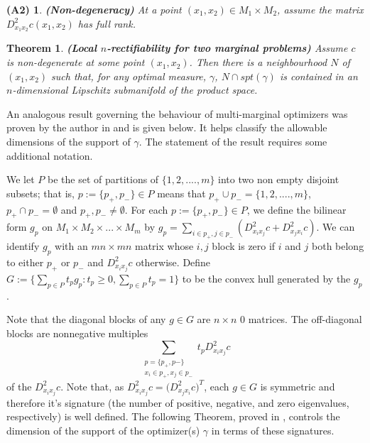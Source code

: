 \documentclass[letter,10pt]{article}
\theoremstyle{dotless}
\begin{document}
\newtheorem*{nondeg}{(A2)}
\begin{nondeg}
\textbf{(Non-degeneracy)} At a point $(x_1,x_2) \in M_1 \times M_2$, assume  the matrix $D_{x_1x_2}^2c(x_1,x_2)$ has full rank.  
\end{nondeg}

\newtheorem{rectifiability}{Theorem}[subsection]
\begin{rectifiability}\label{rectifiability}\textbf{(Local $n$-rectifiability for two marginal problems)}
Assume $c$ is non-degenerate at some point $(x_1,x_2)$.  Then there is a neighbourhood $N$ of $(x_1,x_2)$ such that, for any optimal measure, $\gamma$, $N \cap spt(\gamma)$ is contained in an $n$-dimensional Lipschitz submanifold of the product space.
\end{rectifiability}

An analogous result governing the behaviour of multi-marginal optimizers was proven by the author in \cite{P} and is given below.  It helps classify the allowable dimensions of the support of $\gamma$.  The statement of the result requires some additional notation.

We let $P$ be the set of partitions of $\{1,2,....,m\}$ into two non empty  disjoint subsets; that is, $p:=\{p_+,p_-\} \in P$ means that $p_+ \cup p_- = \{1,2,....,m\}$, $p_+ \cap p_- =\emptyset$ and $p_+,p_- \neq \emptyset$.  For each $p:=\{p_+,p_-\} \in P$, we define the bilinear form $g_p$ on $M_1 \times M_2 \times...\times M_m$ by $g_p = \sum_{i\in p_+,j\in p_-}(D^2_{x_ix_j}c +D^2_{x_jx_i}c)$.  We can identify $g_p$ with an $mn \times mn$ matrix whose  $i,j$ block is zero if $i$ and $j$ both belong to either $p_+$ or $p_-$ and $D^2_{x_ix_j} c$ otherwise. Define $G:=\{\sum_{p \in P}t_p g_p: t_p \geq 0, \sum_{p \in P}t_p=1\}$ to be the convex hull generated by the $g_p$.  


Note that the diagonal blocks of any $g \in G$ are $n \times n$ $0$ matrices.  The off-diagonal blocks are nonnegative multiples 
\begin{equation*}
\sum_{\substack{p=\{p_+,p-\}\\  x_i \in p_+,x_j \in p_-}}t_p  D^2_{x_ix_j}c
\end{equation*}
 of the $D^2_{x_ix_j} c$.
Note that, as $ D^2_{x_ix_j}c= \big(D^2_{x_jx_i}c\big)^T $, each $g \in G$ is symmetric and therefore it's signature (the number of positive, negative, and zero eigenvalues, respectively) is well defined.  The following Theorem, proved in \cite{P},  controls the dimension of the support of the optimizer(s) $\gamma$ in terms of these signatures.
\end{document}
